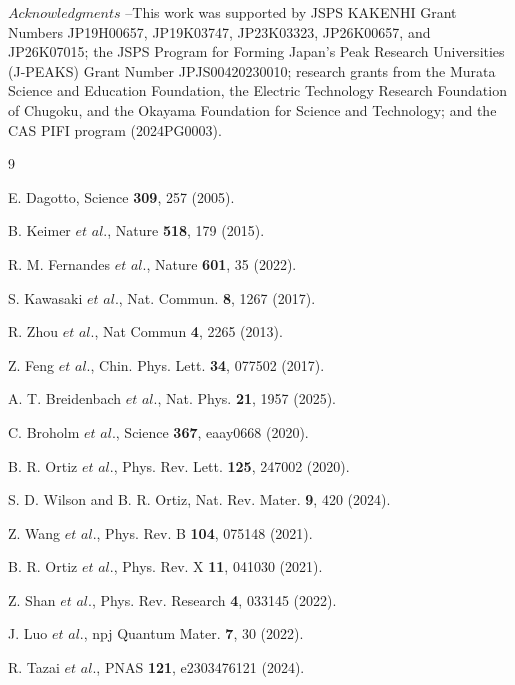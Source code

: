 \documentclass[aps,prl,twocolumn,superscriptaddress]{revtex4-2}
\begin{document}
\begin{acknowledgments}
$Acknowledgments$ --This work was supported by JSPS KAKENHI Grant Numbers JP19H00657, JP19K03747, JP23K03323, JP26K00657, and JP26K07015; the JSPS Program for Forming Japan's Peak Research Universities (J-PEAKS) Grant Number JPJS00420230010; research grants from the Murata Science and Education Foundation, the Electric Technology Research Foundation of Chugoku, and the Okayama Foundation for Science and Technology; and the CAS PIFI program (2024PG0003).
\end{acknowledgments}





\begin{thebibliography}{9}

    E. Dagotto, Science {\bf 309}, 257 (2005).

       B. Keimer $et$ $al$., Nature {\bf 518}, 179 (2015).

  R. M. Fernandes $et$ $al$., Nature {\bf 601}, 35 (2022).

      S. Kawasaki $et$ $al$., Nat. Commun. {\bf 8}, 1267 (2017).

         R. Zhou $et$ $al$., Nat Commun {\bf 4}, 2265 (2013).


   Z. Feng $et$ $al$., Chin. Phys. Lett. {\bf 34}, 077502 (2017).

A. T. Breidenbach $et$ $al$., Nat. Phys. {\bf 21}, 1957 (2025).


  C. Broholm $et$ $al$., Science {\bf 367},  eaay0668 (2020).



B. R. Ortiz $et$ $al$., Phys. Rev. Lett. {\bf 125}, 247002 (2020).

S. D. Wilson and B. R. Ortiz, Nat. Rev. Mater. {\bf 9}, 420 (2024).


Z. Wang $et$ $al$., Phys. Rev. B {\bf 104}, 075148  (2021).

B. R. Ortiz $et$ $al$., Phys. Rev. X {\bf 11}, 041030 (2021).

Z. Shan $et$ $al$., Phys. Rev. Research {\bf 4}, 033145 (2022).

J. Luo $et$ $al$., npj Quantum Mater. {\bf 7}, 30 (2022).

R. Tazai $et$ $al$., PNAS {\bf 121}, e2303476121 (2024).




\end{thebibliography}
\end{document}
